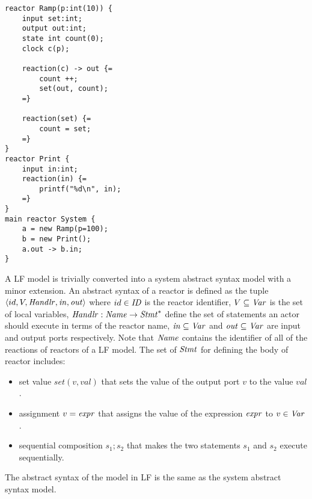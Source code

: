 \begin{lstlisting}[language=LF, multicols=2, caption=Example of a \texttt{Ramp} feeding into a \texttt{Print} reactor (inspired from a LF model presented in \cite{DBLP:conf/dac/LohstrohSGWGSL19}), label=src::LF]
reactor Ramp(p:int(10)) { 
    input set:int;
    output out:int;
    state int count(0);
    clock c(p);
    
    reaction(c) -> out {=
        count ++;
        set(out, count); 
    =}
    
    reaction(set) {= 
        count = set;
    =} 
}
reactor Print { 
    input in:int; 
    reaction(in) {=
        printf("%d\n", in); 
    =}
}
main reactor System {
    a = new Ramp(p=100);
    b = new Print(); 
    a.out -> b.in;
}
\end{lstlisting}

A LF model is trivially converted into a system abstract syntax model with a minor extension. An abstract syntax of a reactor is defined as the tuple $\langle id, V, \mathit{Handlr}, \mathit{in}, \mathit{out}\rangle $ where $id\in \mathit{ID}$ is the reactor identifier, $V \subseteq \mathit{Var}$ is the set of local variables, $\mathit{Handlr} : \mathit{Name} \rightarrow \mathit{Stmt}^*$ define the set of statements an actor should execute in terms of the reactor name, $\mathit{in} \subseteq \mathit{Var}$ and $\mathit{out} \subseteq \mathit{Var}$ are input and output ports respectively. Note that $\mathit{Name}$ contains the identifier of all of the reactions of reactors of a LF model.   %
The set of $\mathit{Stmt}$ for defining the body of reactor includes:\begin{itemize}
    \item set value $set(v, val)$ that sets the value of the output port $v$ to the value $val$.
    \item assignment $v={\it expr}$ that assigns the value of the expression ${\it expr}$ to $v\in\mathit{Var}$.
    \item sequential composition $s_1;s_2$ that makes the two statements $s_1$ and $s_2$ execute sequentially.
\end{itemize}

The abstract syntax of the model in LF is the same as the system abstract syntax model.

